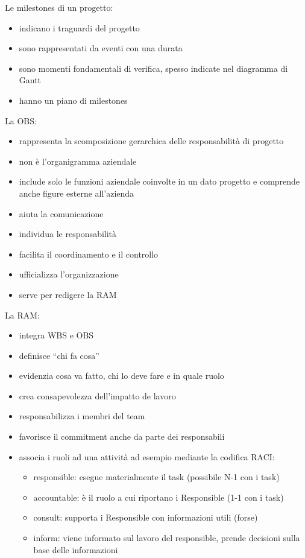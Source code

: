 \documentclass[answers, a4paper, 11pt]{exam}
\begin{document}
Le milestones di un progetto:

\begin{itemize}
    \item indicano i traguardi del progetto
    \item sono rappresentati da eventi con una durata
    \item sono momenti fondamentali di verifica, spesso indicate nel diagramma di Gantt
    \item hanno un piano di milestones
\end{itemize}

La OBS:

\begin{itemize}
    \item rappresenta la scomposizione gerarchica delle responsabilità di progetto
    \item non è l'organigramma aziendale
    \item include solo le funzioni aziendale coinvolte in un dato progetto e comprende anche figure esterne all'azienda
    \item aiuta la comunicazione
    \item individua le responsabilità
    \item facilita il coordinamento e il controllo
    \item ufficializza l'organizzazione
    \item serve per redigere la RAM
\end{itemize}

La RAM:

\begin{itemize}
    \item integra WBS e OBS
    \item definisce ``chi fa cosa''
    \item evidenzia cosa va fatto, chi lo deve fare e in quale ruolo
    \item crea consapevolezza dell'impatto de lavoro
    \item responsabilizza i membri del team
    \item favorisce il commitment anche da parte dei responsabili
    \item associa i ruoli ad una attività ad esempio mediante la codifica RACI:
    \begin{itemize}
        \item responsible: esegue materialmente il task (possibile N-1 con i task)
        \item accountable: è il ruolo a cui riportano i Responsible (1-1 con i task)
        \item consult: supporta i Responsible con informazioni utili (forse)
        \item inform: viene informato sul lavoro del responsible, prende decisioni sulla base delle informazioni
    \end{itemize}
\end{itemize}
\end{document}
